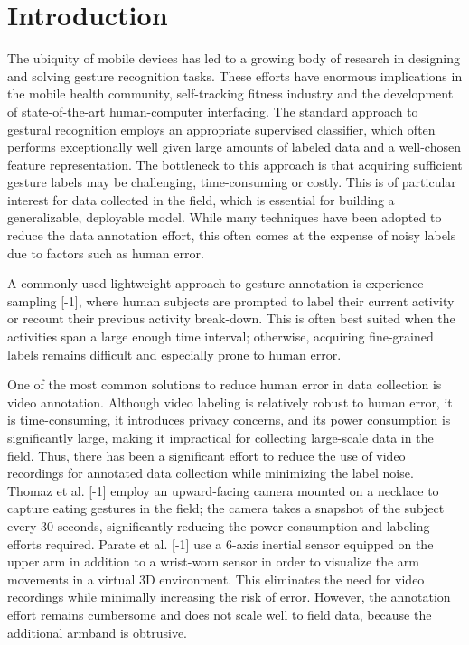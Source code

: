 \documentclass{sigchi}
\begin{document}
 


\section{Introduction}

The ubiquity of mobile devices has led to a growing body of research in designing and solving gesture recognition tasks. These efforts have enormous implications in the mobile health community, self-tracking fitness industry and the development of state-of-the-art human-computer interfacing. The standard approach to gestural recognition employs an appropriate supervised classifier, which often performs exceptionally well given large amounts of labeled data and a well-chosen feature representation. The bottleneck to this approach is that acquiring sufficient gesture labels may be challenging, time-consuming or costly. This is of particular interest for data collected in the field, which is essential for building a generalizable,  deployable model. While many techniques have been adopted to reduce the data annotation effort, this often comes at the expense of noisy labels due to factors such as human error.

A commonly used lightweight approach to gesture annotation is experience sampling [-1], where human subjects are prompted to label their current activity or recount their previous activity break-down. This is often best suited when the activities span a large enough time interval; otherwise, acquiring fine-grained labels remains difficult and especially prone to human error.

One of the most common solutions to reduce human error in data collection is video annotation. Although video labeling is relatively robust to human error, it is time-consuming, it introduces privacy concerns, and its power consumption is significantly large, making it impractical for collecting large-scale data in the field. Thus, there has been a significant effort to reduce the use of video recordings for annotated data collection while minimizing the label noise. Thomaz et al. [-1] employ an upward-facing camera mounted on a necklace to capture eating gestures in the field; the camera takes a snapshot of the subject every 30 seconds, significantly reducing the power consumption and labeling efforts required. Parate et al. [-1] use a 6-axis inertial sensor equipped on the upper arm in addition to a wrist-worn sensor in order to visualize the arm movements in a virtual 3D environment. This eliminates the need for video recordings while minimally increasing the risk of error. However, the annotation effort remains cumbersome and does not scale well to field data, because the additional armband is obtrusive.
\end{document}
